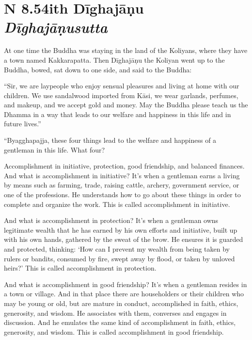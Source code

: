 \documentclass[12pt,openany]{book}%
\newcommand*{\suttatitleacronym}[1]{\smaller[2]{#1}\vspace*{.3em}}
\newcommand*{\suttatitletranslation}[1]{\linebreak{#1}}
\newcommand*{\suttatitleroot}[1]{\linebreak\smaller[2]\itshape{#1}}
\newcommand*{\tocacronym}[1]{\hspace*{-3.3em}{#1}\quad}
\newcommand*{\toctranslation}[1]{#1}
\newcommand*{\tocroot}[1]{(\textit{#1})}
\begin{document}
%
\section*{{\suttatitleacronym AN 8.54}{\suttatitletranslation With Dīghajāṇu }{\suttatitleroot Dīghajāṇusutta}}
\addcontentsline{toc}{section}{\tocacronym{AN 8.54} \toctranslation{With Dīghajāṇu } \tocroot{Dīghajāṇusutta}}

At one time the Buddha was staying in the land of the Koliyans, where they have a town named Kakkarapatta. Then \textsanskrit{Dīghajāṇu} the Koliyan went up to the Buddha, bowed, sat down to one side, and said to the Buddha: 

“Sir, we are laypeople who enjoy sensual pleasures and living at home with our children. We use sandalwood imported from \textsanskrit{Kāsi}, we wear garlands, perfumes, and makeup, and we accept gold and money. May the Buddha please teach us the Dhamma in a way that leads to our welfare and happiness in this life and in future lives.” 

“Byagghapajja, these four things lead to the welfare and happiness of a gentleman in this life. What four? 

Accomplishment in initiative, protection, good friendship, and balanced finances. And what is accomplishment in initiative? It’s when a gentleman earns a living by means such as farming, trade, raising cattle, archery, government service, or one of the professions. He understands how to go about these things in order to complete and organize the work. This is called accomplishment in initiative. 

And what is accomplishment in protection? It’s when a gentleman owns legitimate wealth that he has earned by his own efforts and initiative, built up with his own hands, gathered by the sweat of the brow. He ensures it is guarded and protected, thinking: ‘How can I prevent my wealth from being taken by rulers or bandits, consumed by fire, swept away by flood, or taken by unloved heirs?’ This is called accomplishment in protection. 

And what is accomplishment in good friendship? It’s when a gentleman resides in a town or village. And in that place there are householders or their children who may be young or old, but are mature in conduct, accomplished in faith, ethics, generosity, and wisdom. He associates with them, converses and engages in discussion. And he emulates the same kind of accomplishment in faith, ethics, generosity, and wisdom. This is called accomplishment in good friendship. 
\end{document}
